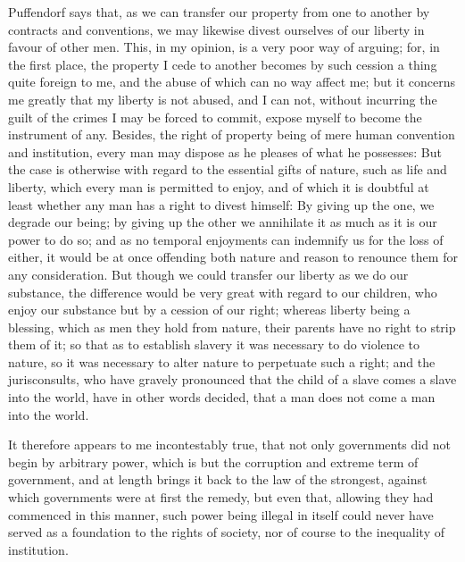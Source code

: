 \documentclass[11pt,twocolumn]{ltugboat}
\begin{document}
Puffendorf says that, as we can transfer our property from one to
another by contracts and conventions, we may likewise divest ourselves
of our liberty in favour of other men. This, in my opinion, is a very
poor way of arguing; for, in the first place, the property I cede to
another becomes by such cession a thing quite foreign to me, and the
abuse of which can no way affect me; but it concerns me greatly that
my liberty is not abused, and I can not, without incurring the guilt
of the crimes I may be forced to commit, expose myself to become the
instrument of any. Besides, the right of property being of mere human
convention and institution, every man may dispose as he pleases of
what he possesses: But the case is otherwise with regard to the
essential gifts of nature, such as life and liberty, which every man
is permitted to enjoy, and of which it is doubtful at least whether
any man has a right to divest himself: By giving up the one, we
degrade our being; by giving up the other we annihilate it as much as
it is our power to do so; and as no temporal enjoyments can indemnify
us for the loss of either, it would be at once offending both nature
and reason to renounce them for any consideration. But though we could
transfer our liberty as we do our substance, the difference would be
very great with regard to our children, who enjoy our substance but by
a cession of our right; whereas liberty being a blessing, which as men
they hold from nature, their parents have no right to strip them of
it; so that as to establish slavery it was necessary to do violence to
nature, so it was necessary to alter nature to perpetuate such a
right; and the jurisconsults, who have gravely pronounced that the
child of a slave comes a slave into the world, have in other words
decided, that a man does not come a man into the world.

It therefore appears to me incontestably true, that not only
governments did not begin by arbitrary power, which is but the
corruption and extreme term of government, and at length brings it
back to the law of the strongest, against which governments were at
first the remedy, but even that, allowing they had commenced in this
manner, such power being illegal in itself could never have served as
a foundation to the rights of society, nor of course to the inequality
of institution.
\end{document}
